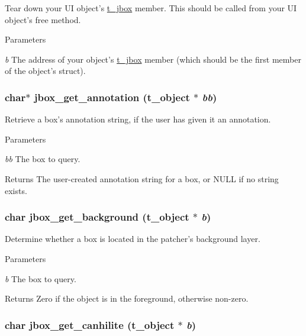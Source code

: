 Tear down your UI object's \hyperlink{structt__jbox}{t\_\-jbox} member. This should be called from your UI object's free method.


\begin{DoxyParams}{Parameters}
\item[{\em b}]The address of your object's \hyperlink{structt__jbox}{t\_\-jbox} member (which should be the first member of the object's struct). \end{DoxyParams}
\hypertarget{group__jbox_gae370a9514d4075d00eb6a336d95390b0}{
\subsubsection[{jbox\_\-get\_\-annotation}]{\setlength{\rightskip}{0pt plus 5cm}char$\ast$ jbox\_\-get\_\-annotation ({\bf t\_\-object} $\ast$ {\em bb})}}
\label{group__jbox_gae370a9514d4075d00eb6a336d95390b0}


Retrieve a box's annotation string, if the user has given it an annotation. 
\begin{DoxyParams}{Parameters}
\item[{\em bb}]The box to query. \end{DoxyParams}
\begin{DoxyReturn}{Returns}
The user-\/created annotation string for a box, or NULL if no string exists. 
\end{DoxyReturn}
\hypertarget{group__jbox_ga453e949f39ffe6a95063a8d554e25adf}{
\subsubsection[{jbox\_\-get\_\-background}]{\setlength{\rightskip}{0pt plus 5cm}char jbox\_\-get\_\-background ({\bf t\_\-object} $\ast$ {\em b})}}
\label{group__jbox_ga453e949f39ffe6a95063a8d554e25adf}


Determine whether a box is located in the patcher's background layer. 
\begin{DoxyParams}{Parameters}
\item[{\em b}]The box to query. \end{DoxyParams}
\begin{DoxyReturn}{Returns}
Zero if the object is in the foreground, otherwise non-\/zero. 
\end{DoxyReturn}
\hypertarget{group__jbox_ga57ff4e001cd4725d3cb7afb5a5dd4b56}{
\subsubsection[{jbox\_\-get\_\-canhilite}]{\setlength{\rightskip}{0pt plus 5cm}char jbox\_\-get\_\-canhilite ({\bf t\_\-object} $\ast$ {\em b})}}
\label{group__jbox_ga57ff4e001cd4725d3cb7afb5a5dd4b56}


